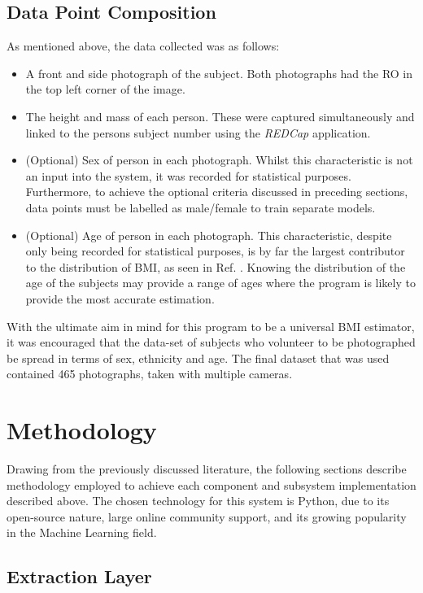 \documentclass[conference]{IEEEtran}
\begin{document}
\subsection{Data Point Composition}
As mentioned above, the data collected was as follows:
\begin{itemize}
\item A front and side photograph of the subject.
Both photographs had the RO in the top left corner of the image.
\item The height and mass of each person.
These were captured simultaneously and linked to the persons subject number using the \textit{REDCap} application.
\item (Optional) Sex of person in each photograph.
Whilst this characteristic is not an input into the system, it was recorded for statistical purposes.
Furthermore, to achieve the optional criteria discussed in preceding sections, data points must be labelled as male/female to train separate models.
\item (Optional) Age of person in each photograph.
This characteristic, despite only being recorded for statistical purposes, is by far the largest contributor to the distribution of BMI, as seen in Ref. \cite{bmiage}.
Knowing the distribution of the age of the subjects may provide a range of ages where the program is likely to provide the most accurate estimation.
\end{itemize}
With the ultimate aim in mind for this program to be a universal BMI estimator, it was encouraged that the data-set of subjects who volunteer to be photographed be spread in terms of sex, ethnicity and age.
The final dataset that was used contained 465 photographs, taken with multiple cameras.

\section{Methodology}
Drawing from the previously discussed literature, the following sections describe methodology employed to achieve each component and subsystem implementation described above.
The chosen technology for this system is Python, due to its open-source nature, large online community support, and its growing popularity in the Machine Learning field.
\subsection{Extraction Layer}
\end{document}
